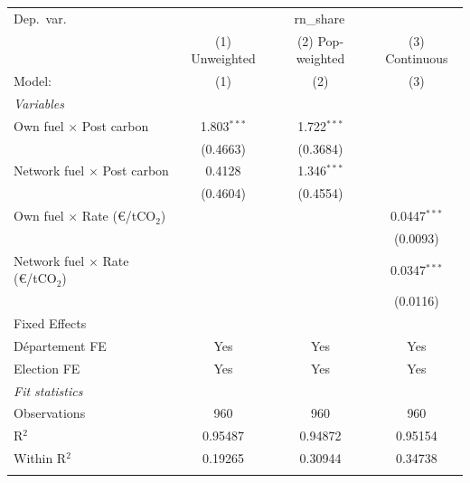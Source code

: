\begingroup
\centering
\begin{tabular}{lccc}
   \tabularnewline \midrule \midrule
   Dep.\ var. & \multicolumn{3}{c}{rn\_share}\\
                                                & (1) Unweighted & (2) Pop-weighted & (3) Continuous \\   
   Model:                                       & (1)            & (2)              & (3)\\  
   \midrule
   \emph{Variables}\\
   Own fuel $\times$ Post carbon                & 1.803$^{***}$  & 1.722$^{***}$    &   \\   
                                                & (0.4663)       & (0.3684)         &   \\   
   Network fuel $\times$ Post carbon            & 0.4128         & 1.346$^{***}$    &   \\   
                                                & (0.4604)       & (0.4554)         &   \\   
   Own fuel $\times$ Rate (\euro/tCO$_2$)       &                &                  & 0.0447$^{***}$\\   
                                                &                &                  & (0.0093)\\   
   Network fuel $\times$ Rate (\euro/tCO$_2$)   &                &                  & 0.0347$^{***}$\\   
                                                &                &                  & (0.0116)\\   
   \midrule Fixed Effects\\
   D\'{e}partement FE                           & Yes            & Yes              & Yes\\  
   Election FE                                  & Yes            & Yes              & Yes\\  
   \midrule
   \emph{Fit statistics}\\
   Observations                                 & 960            & 960              & 960\\  
   R$^2$                                        & 0.95487        & 0.94872          & 0.95154\\  
   Within R$^2$                                 & 0.19265        & 0.30944          & 0.34738\\  
   \midrule \midrule & \tabularnewline
\end{tabular}
\par\endgroup
